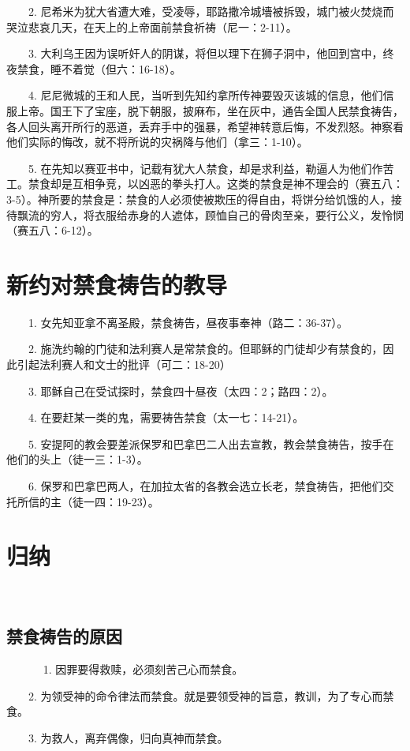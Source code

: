 　　2. 尼希米为犹大省遭大难，受凌辱，耶路撒冷城墻被拆毁，城门被火焚烧而哭泣悲哀几天，在天上的上帝面前禁食祈祷（尼一：2-11）。

　　3. 大利乌王因为误听奸人的阴谋，将但以理下在狮子洞中，他回到宫中，终夜禁食，睡不着觉（但六：16-18）。

　　4. 尼尼微城的王和人民，当听到先知约拿所传神要毁灭该城的信息，他们信服上帝。国王下了宝座，脱下朝服，披麻布，坐在灰中，通告全国人民禁食祷告，各人回头离开所行的恶道，丢弃手中的强暴，希望神转意后悔，不发烈怒。神察看他们实际的悔改，就不将所说的灾祸降与他们（拿三：1-10）。　

　　5. 在先知以赛亚书中，记载有犹大人禁食，却是求利益，勒逼人为他们作苦工。禁食却是互相争竞，以凶恶的拳头打人。这类的禁食是神不理会的（赛五八：3-5）。神所要的禁食是：禁食的人必须使被欺压的得自由，将饼分给饥饿的人，接待飘流的穷人，将衣服给赤身的人遮体，顾恤自己的骨肉至亲，要行公义，发怜悯（赛五八：6-12）。　　
\section{新约对禁食祷告的教导}

　　1. 女先知亚拿不离圣殿，禁食祷告，昼夜事奉神（路二：36-37）。

　　2. 施洗约翰的门徒和法利赛人是常禁食的。但耶稣的门徒却少有禁食的，因此引起法利赛人和文士的批评（可二：18-20）

　　3. 耶稣自己在受试探时，禁食四十昼夜（太四：2；路四：2）。

　　4. 在要赶某一类的鬼，需要祷告禁食（太一七：14-21）。

　　5. 安提阿的教会要差派保罗和巴拿巴二人出去宣教，教会禁食祷告，按手在他们的头上（徒一三：1-3）。

　　6. 保罗和巴拿巴两人，在加拉太省的各教会选立长老，禁食祷告，把他们交托所信的主（徒一四：19-23）。　　

\section{归纳}

　
\subsection{禁食祷告的原因}　
　　1. 因罪要得救赎，必须刻苦己心而禁食。

　　2. 为领受神的命令律法而禁食。就是要领受神的旨意，教训，为了专心而禁食。

　　3. 为救人，离弃偶像，归向真神而禁食。


